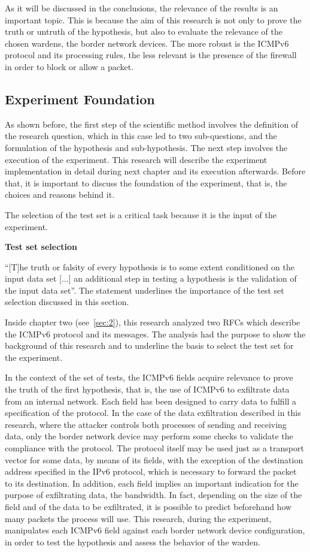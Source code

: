 \documentclass[12pt]{article}
\begin{document}
As it will be discussed in the conclusions, the relevance of the results is an important topic. This is because the aim of this research is not only to prove the truth or untruth of the hypothesis, but also to evaluate the relevance of the chosen wardens, the border network devices. The more robust is the ICMPv6 protocol and its processing rules, the less relevant is the presence of the firewall in order to block or allow a packet.

\subsection{Experiment Foundation}
\label{sub:expFound}

As shown before, the first step of the scientific method involves the definition of the research question, which in this case led to two sub-questions, and the formulation of the hypothesis and sub-hypothesis. The next step involves the execution of the experiment. This research will describe the experiment implementation in detail during next chapter and its execution afterwards. Before that, it is important to discuss the foundation of the experiment, that is, the choices and reasons behind it.

The selection of the test set is a critical task because it is the input of the experiment.

\textbf{Test set selection}
\label{subsub:testSel}

``[T]he truth or falsity of every hypothesis is to some extent conditioned on the input data set [...] an additional step in testing a hypothesis is the validation of the input data set''\cite{secExperiments}. The statement underlines the importance of the test set selection discussed in this section.

Inside chapter two (see~\cref{sec:2}), this research analyzed two RFCs which describe the ICMPv6 protocol and its messages. The analysis had the purpose to show the background of this research and to underline the basis to select the test set for the experiment.

In the context of the set of tests, the ICMPv6 fields acquire relevance to prove the truth of the first hypothesis, that is, the use of ICMPv6 to exfiltrate data from an internal network. Each field has been designed to carry data to fulfill a specification of the protocol. In the case of the data exfiltration described in this research, where the attacker controls both processes of sending and receiving data, only the border network device may perform some checks to validate the compliance with the protocol. The protocol itself may be used just as a transport vector for some data, by means of its fields, with the exception of the destination address specified in the IPv6 protocol, which is necessary to forward the packet to its destination. In addition, each field implies an important indication for the purpose of exfiltrating data, the bandwidth. In fact, depending on the size of the field and of the data to be exfiltrated, it is possible to predict beforehand how many packets the process will use. This research, during the experiment, manipulates each ICMPv6 field against each border network device configuration, in order to test the hypothesis and assess the behavior of the warden.
\end{document}
